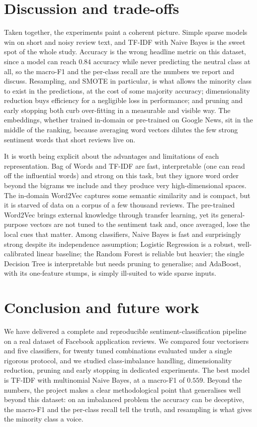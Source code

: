 \documentclass[11pt,a4paper]{article}
\begin{document}
\section{Discussion and trade-offs}
\label{sec:discussion}
Taken together, the experiments paint a coherent picture. Simple sparse models win on
short and noisy review text, and TF-IDF with Naive Bayes is the sweet spot of the whole
study. Accuracy is the wrong headline metric on this dataset, since a model can reach
$0.84$ accuracy while never predicting the neutral class at all, so the macro-F1 and the
per-class recall are the numbers we report and discuss. Resampling, and SMOTE in
particular, is what allows the minority class to exist in the predictions, at the cost of
some majority accuracy; dimensionality reduction buys efficiency for a negligible loss in
performance; and pruning and early stopping both curb over-fitting in a measurable and
visible way. The embeddings, whether trained in-domain or pre-trained on Google News, sit
in the middle of the ranking, because averaging word vectors dilutes the few strong
sentiment words that short reviews live on.

It is worth being explicit about the advantages and limitations of each representation.
Bag of Words and TF-IDF are fast, interpretable (one can read off the influential words)
and strong on this task, but they ignore word order beyond the bigrams we include and
they produce very high-dimensional spaces. The in-domain Word2Vec captures some semantic
similarity and is compact, but it is starved of data on a corpus of a few thousand
reviews. The pre-trained Word2Vec brings external knowledge through transfer learning,
yet its general-purpose vectors are not tuned to the sentiment task and, once averaged,
lose the local cues that matter. Among classifiers, Naive Bayes is fast and surprisingly
strong despite its independence assumption; Logistic Regression is a robust,
well-calibrated linear baseline; the Random Forest is reliable but heavier; the single
Decision Tree is interpretable but needs pruning to generalise; and AdaBoost, with its
one-feature stumps, is simply ill-suited to wide sparse inputs.

\section{Conclusion and future work}
\label{sec:conclusion}
We have delivered a complete and reproducible sentiment-classification pipeline on a real
dataset of Facebook application reviews. We compared four vectorisers and five
classifiers, for twenty tuned combinations evaluated under a single rigorous protocol,
and we studied class-imbalance handling, dimensionality reduction, pruning and early
stopping in dedicated experiments. The best model is TF-IDF with multinomial Naive Bayes,
at a macro-F1 of $0.559$. Beyond the numbers, the project makes a clear methodological
point that generalises well beyond this dataset: on an imbalanced problem the accuracy
can be deceptive, the macro-F1 and the per-class recall tell the truth, and resampling is
what gives the minority class a voice.
\end{document}
